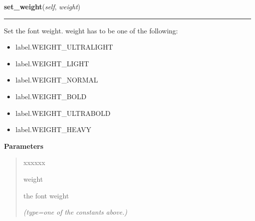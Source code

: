     \label{pygtk_chart:label:Label:set_weight}

    \vspace{0.5ex}

\hspace{.8\funcindent}\begin{boxedminipage}{\funcwidth}

    \raggedright \textbf{set\_weight}(\textit{self}, \textit{weight})

    \vspace{-1.5ex}

    \rule{\textwidth}{0.5\fboxrule}
\setlength{\parskip}{2ex}
    Set the font weight. weight has to be one of the following:

    \begin{itemize}
    \setlength{\parskip}{0.6ex}
      \item label.WEIGHT\_ULTRALIGHT

      \item label.WEIGHT\_LIGHT

      \item label.WEIGHT\_NORMAL

      \item label.WEIGHT\_BOLD

      \item label.WEIGHT\_ULTRABOLD

      \item label.WEIGHT\_HEAVY

    \end{itemize}

\setlength{\parskip}{1ex}
      \textbf{Parameters}
      \vspace{-1ex}

      \begin{quote}
        \begin{Ventry}{xxxxxx}

          \item[weight]

          the font weight

            {\it (type=one of the constants above.)}

        \end{Ventry}

      \end{quote}

    \end{boxedminipage}

